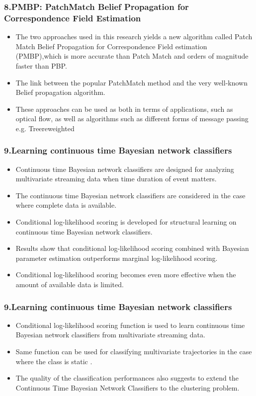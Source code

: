 \documentclass{beamer}
\begin{document}
\begin{frame}
\frametitle{\textbf{8.PMBP: PatchMatch Belief Propagation for Correspondence Field Estimation}}
\begin{itemize}
\item The two approaches used in this research yields a new algorithm called Patch Match Belief Propagation for Correspondence Field estimation (PMBP),which is more accurate than Patch Match and orders of magnitude faster than PBP.
\item The link between the popular PatchMatch method and the very well-known Belief propagation algorithm.
\item These approaches  can be  used as both in terms of applications, such as optical flow, as well as algorithms such as different forms of message passing e.g.  Treereweighted
\end{itemize}
\end{frame}

\begin{frame}
\frametitle{\textbf{9.Learning continuous time Bayesian network classifiers}}

\begin{itemize}
\item Continuous time Bayesian network classifiers are designed for analyzing multivariate streaming data when time duration of event matters.
\item The  continuous time  Bayesian network  classifiers are  considered  in  the  case where  complete  data is available.
\item Conditional log-likelihood  scoring is developed for structural learning on continuous time Bayesian network classifiers.
\item Results show that conditional  log-likelihood  scoring combined with Bayesian parameter estimation outperforms marginal log-likelihood scoring.\item Conditional log-likelihood  scoring becomes even more effective when  the amount of available data is limited.
\end{itemize}
\end{frame}

\begin{frame}
\frametitle{\textbf{9.Learning continuous time Bayesian network classifiers}}
\begin{itemize}
\item Conditional log-likelihood scoring function is used  to learn continuous time Bayesian network classifiers from multivariate streaming  data.
\item Same function can be used for classifying multivariate trajectories in the case where the class is static .
\item The quality of the classification performances also suggests to extend the Continuous Time Bayesian Network Classifiers to the clustering problem.
\end{itemize}
\end{frame}
\end{document}
